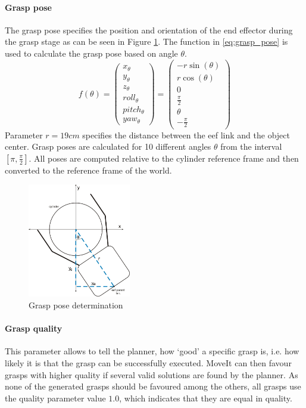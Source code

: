 \paragraph{Grasp pose} The grasp pose specifies the position and orientation of the end effector during the grasp stage as can be seen in Figure \ref{fig:grasp_pose}. The function in \ref{eq:grasp_pose} is used to calculate the grasp pose based on angle $\theta$. 
\begin{equation} \label{eq:grasp_pose}
f(\theta) = 
\begin{pmatrix}
x_{\theta} \\
y_{\theta} \\
z_{\theta} \\ 
roll_{\theta} \\
pitch_{\theta} \\
yaw_{\theta}
\end{pmatrix} =
\begin{pmatrix}
-r\sin(\theta) \\
r\cos(\theta) \\
0 \\ 
\frac{\pi}{2} \\
\theta \\
-\frac{\pi}{2}
\end{pmatrix}
\end{equation}
Parameter $r=19cm$ specifies the distance between the eef link and the object center. Grasp poses are calculated for 10 different angles $\theta$ from the interval $[\pi, \frac{\pi}{2}]$. All poses are computed relative to the cylinder reference frame and then converted to the reference frame of the world.

\begin{figure}[ht]
	\centering
  	\includegraphics[width=0.4\textwidth]{images/grasps.jpg}
	\caption{Grasp pose determination}
	\label{fig:grasp_pose}
\end{figure}

\paragraph{Grasp quality} This parameter allows to tell the planner, how `good' a specific grasp is, i.e. how likely it is that the grasp can be successfully executed. MoveIt can then favour grasps with higher quality if several valid solutions are found by the planner. As none of the generated grasps should be favoured among the others, all grasps use the quality parameter value $1.0$, which indicates that they are equal in quality.

